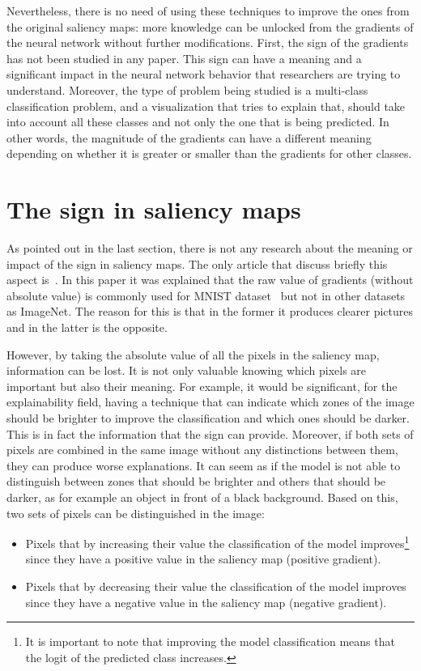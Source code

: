 \documentclass[preprint,12pt]{elsarticle}
\begin{document}
Nevertheless, there is no need of using these techniques to improve the ones from the original saliency maps: more knowledge can be unlocked from the gradients of the neural network without further modifications. First, the sign of the gradients has not been studied in any paper. This sign can have a meaning and a significant impact in the neural network behavior that researchers are trying to understand. Moreover, the type of problem being studied is a multi-class classification problem, and a visualization that tries to explain that, should take into account all these classes and not only the one that is being predicted. In other words, the magnitude of the gradients can have a different meaning depending on whether it is greater or smaller than the gradients for other classes. 

\section{The sign in saliency maps}
\label{sec:the sign in saliency maps}
As pointed out in the last section, there is not any research about the meaning or impact of the sign in saliency maps. The only article that discuss briefly this aspect is~\cite{Smilkov2017}. In this paper it was explained that the raw value of gradients (without absolute value) is commonly used for MNIST dataset~\cite{MNISTHandwrittenDigit} but not in other datasets as ImageNet. The reason for this is that in the former it produces clearer pictures and in the latter is the opposite. 

However, by taking the absolute value of all the pixels in the saliency map, information can be lost. It is not only valuable knowing which pixels are important but also their meaning. For example, it would be significant, for the explainability field, having a technique that can indicate which zones of the image should be brighter to improve the classification and which ones should be darker. This is in fact the information that the sign can provide. Moreover, if both sets of pixels are combined in the same image without any distinctions between them, they can produce worse explanations. It can seem as if the model is not able to distinguish between zones that should be brighter and others that should be darker, as for example an object in front of a black background. Based on this, two sets of pixels can be distinguished in the image:

\begin{itemize}
    \item Pixels that by increasing their value the classification of the model improves\footnote{It is important to note that improving the model classification means that the logit of the predicted class increases. } since they have a positive value in the saliency map (positive gradient).
    \item Pixels that by decreasing their value the classification of the model improves since they have a negative value in the saliency map (negative gradient).
\end{itemize}
\end{document}
